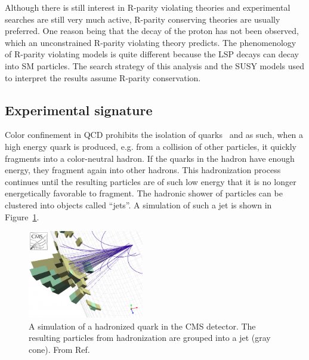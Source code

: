 Although there is still interest in R-parity violating theories and experimental searches are still
very much active, R-parity conserving theories are usually preferred. One reason being that the decay of 
the proton has not been observed, which an unconstrained R-parity violating theory predicts. The 
phenomenology of R-parity violating models is quite different because the LSP decays can decay into SM 
particles. The search strategy of this analysis and the SUSY models used to interpret the results assume 
R-parity conservation.

\subsection{Experimental signature}
\label{sec:signature}

Color confinement in QCD prohibits the isolation of quarks~\cite{Ellis:1991qj} 
and as such, when a high energy quark is produced, e.g. 
from a collision of other particles, it quickly fragments into a 
color-neutral hadron. If the quarks in the hadron have enough energy, 
they fragment again into other hadrons. This hadronization process 
continues until the resulting particles are of such low energy that it
is no longer energetically favorable to fragment. The hadronic shower of
particles can be clustered into objects called ``jets''. A simulation 
of such a jet is shown in Figure~\ref{fig:jets}.  

\begin{figure}[h!t]
  \begin{center}
       \includegraphics[width=0.45\textwidth,]{figures/JetConeAndPFJet.png}
       \caption{A simulation of a hadronized quark in the CMS detector. The
       resulting particles from hadronization are grouped into a jet (gray cone). From Ref.~\cite{QDJet}}
    \label{fig:jets}
  \end{center}
\end{figure}

